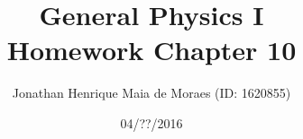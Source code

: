 \title{General Physics I \\ Homework Chapter 10}
\author{Jonathan Henrique Maia de Moraes (ID: 1620855)}
\date{04/??/2016}
\maketitle
